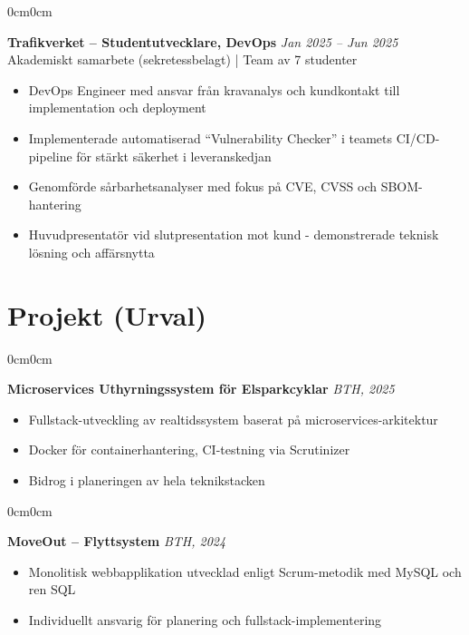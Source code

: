 \documentclass[10pt, letterpaper]{article}
\newenvironment{highlights}{
    \begin{itemize}[topsep=0.10cm, parsep=0.10cm, partopsep=0pt, itemsep=0pt, leftmargin=10pt]
}{
    \end{itemize}
}
\newenvironment{onecolentry}{
    \begin{adjustwidth}{0cm}{0cm}
}{
    \end{adjustwidth}
}
\begin{document}
    \vspace{0.3cm}

    \begin{onecolentry}
        \textbf{Trafikverket -- Studentutvecklare, DevOps} \hfill \textit{Jan 2025 -- Jun 2025} \\

            Akademiskt samarbete (sekretessbelagt) | Team av 7 studenter \\
        \begin{highlights}
            \item DevOps Engineer med ansvar från kravanalys och kundkontakt till implementation och deployment
            \item Implementerade automatiserad ``Vulnerability Checker'' i teamets CI/CD-pipeline för stärkt säkerhet i leveranskedjan
            \item Genomförde sårbarhetsanalyser med fokus på CVE, CVSS och SBOM-hantering
            \item Huvudpresentatör vid slutpresentation mot kund - demonstrerade teknisk lösning och affärsnytta
        \end{highlights}
    \end{onecolentry}

    \section{Projekt (Urval)}

    \begin{onecolentry}
        \textbf{Microservices Uthyrningssystem för Elsparkcyklar} \hfill \textit{BTH, 2025}
        \begin{highlights}
            \item Fullstack-utveckling av realtidssystem baserat på microservices-arkitektur
            \item Docker för containerhantering, CI-testning via Scrutinizer
            \item Bidrog i planeringen av hela teknikstacken
        \end{highlights}
    \end{onecolentry}

    \vspace{0.2cm}

    \begin{onecolentry}
        \textbf{MoveOut -- Flyttsystem} \hfill \textit{BTH, 2024}
        \begin{highlights}
            \item Monolitisk webbapplikation utvecklad enligt Scrum-metodik med MySQL och ren SQL
            \item Individuellt ansvarig för planering och fullstack-implementering
        \end{highlights}
    \end{onecolentry}
\end{document}
